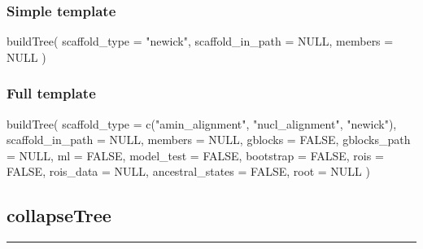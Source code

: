 \documentclass[
]{krantz}
\newenvironment{Shaded}{\begin{snugshade}}{\end{snugshade}}
\newcommand{\AttributeTok}[1]{\textcolor[rgb]{0.77,0.63,0.00}{#1}}
\newcommand{\ConstantTok}[1]{\textcolor[rgb]{0.00,0.00,0.00}{#1}}
\newcommand{\FunctionTok}[1]{\textcolor[rgb]{0.00,0.00,0.00}{#1}}
\newcommand{\NormalTok}[1]{#1}
\newcommand{\StringTok}[1]{\textcolor[rgb]{0.31,0.60,0.02}{#1}}
\begin{document}
\hypertarget{simple-template}{%
\subsubsection{Simple template}\label{simple-template}}

\begin{Shaded}
\begin{Highlighting}[]
\FunctionTok{buildTree}\NormalTok{(}
  \AttributeTok{scaffold\_type =} \StringTok{"newick"}\NormalTok{,}
  \AttributeTok{scaffold\_in\_path =} \ConstantTok{NULL}\NormalTok{,}
  \AttributeTok{members =} \ConstantTok{NULL}
\NormalTok{)}
\end{Highlighting}
\end{Shaded}

\hypertarget{full-template}{%
\subsubsection{Full template}\label{full-template}}

\begin{Shaded}
\begin{Highlighting}[]
\FunctionTok{buildTree}\NormalTok{(}
  \AttributeTok{scaffold\_type =} \FunctionTok{c}\NormalTok{(}\StringTok{"amin\_alignment"}\NormalTok{, }\StringTok{"nucl\_alignment"}\NormalTok{, }\StringTok{"newick"}\NormalTok{),}
  \AttributeTok{scaffold\_in\_path =} \ConstantTok{NULL}\NormalTok{,}
  \AttributeTok{members =} \ConstantTok{NULL}\NormalTok{,}
  \AttributeTok{gblocks =} \ConstantTok{FALSE}\NormalTok{, }
  \AttributeTok{gblocks\_path =} \ConstantTok{NULL}\NormalTok{,}
  \AttributeTok{ml =} \ConstantTok{FALSE}\NormalTok{, }
  \AttributeTok{model\_test =} \ConstantTok{FALSE}\NormalTok{,}
  \AttributeTok{bootstrap =} \ConstantTok{FALSE}\NormalTok{,}
  \AttributeTok{rois =} \ConstantTok{FALSE}\NormalTok{, }
  \AttributeTok{rois\_data =} \ConstantTok{NULL}\NormalTok{,}
  \AttributeTok{ancestral\_states =} \ConstantTok{FALSE}\NormalTok{,}
  \AttributeTok{root =} \ConstantTok{NULL}
\NormalTok{)}
\end{Highlighting}
\end{Shaded}

\hypertarget{collapsetree}{%
\subsection{collapseTree}\label{collapsetree}}

\begin{center}\rule{0.5\linewidth}{0.5pt}\end{center}
\end{document}
